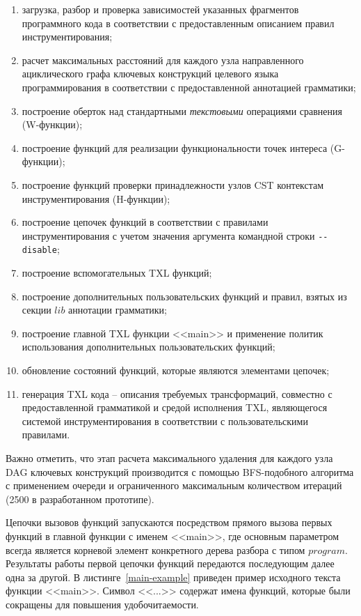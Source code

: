 \begin{enumerate}[noitemsep]
  \item загрузка, разбор и проверка зависимостей указанных фрагментов программного кода в соответствии с предоставленным описанием правил инструментирования;
  \item расчет максимальных расстояний для каждого узла направленного ациклического графа ключевых конструкций целевого языка программирования в соответствии с предоставленной аннотацией грамматики;
  \item построение оберток над стандартными \textit{текстовыми} операциями сравнения (W-функции);
  \item построение функций для реализации функциональности точек интереса (G-функции);
  \item построение функций проверки принадлежности узлов CST контекстам инструментирования (H-функции);
  \item построение цепочек функций в соответствии с правилами инструментирования с учетом значения аргумента командной строки \lstinline{--disable};
  \item построение вспомогательных TXL функций;
  \item построение дополнительных пользовательских функций и правил, взятых из секции $lib$ аннотации грамматики;
  \item построение главной TXL функции <<main>> и применение политик использования дополнительных пользовательских функций;
  \item обновление состояний функций, которые являются элементами цепочек;
  \item генерация TXL кода -- описания требуемых трансформаций, совместно с предоставленной грамматикой и средой исполнения TXL, являющегося системой инструментирования в соответствии с пользовательскими правилами.
\end{enumerate}

Важно отметить, что этап расчета максимального удаления для каждого узла DAG ключевых конструкций производится с помощью BFS-подобного алгоритма с применением очереди и ограниченного максимальным количеством итераций (2500 в разработанном прототипе).

Цепочки вызовов функций запускаются посредством прямого вызова первых функций в главной функции с именем <<main>>, где  основным параметром всегда является корневой элемент конкретного дерева разбора с типом $program$.
Результаты работы первой цепочки функций передаются последующим далее одна за другой.
В листинге~\ref{main-example} приведен пример исходного текста функции <<main>>.
Символ <<...>> содержат имена функций, которые были сокращены для повышения удобочитаемости.

